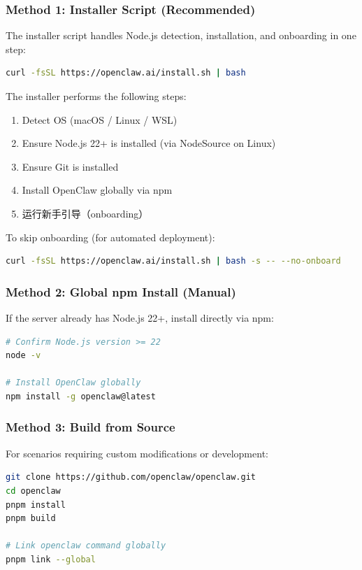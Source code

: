 \subsubsection{Method 1: Installer Script (Recommended)}

The installer script handles Node.js detection, installation, and onboarding in one step:

\begin{lstlisting}[language=bash]
curl -fsSL https://openclaw.ai/install.sh | bash
\end{lstlisting}

The installer performs the following steps:
\begin{enumerate}
  \item Detect OS (macOS / Linux / WSL)
  \item Ensure Node.js 22+ is installed (via NodeSource on Linux)
  \item Ensure Git is installed
  \item Install OpenClaw globally via npm
  \item 运行新手引导（onboarding）
\end{enumerate}

To skip onboarding (for automated deployment):

\begin{lstlisting}[language=bash]
curl -fsSL https://openclaw.ai/install.sh | bash -s -- --no-onboard
\end{lstlisting}

\subsubsection{Method 2: Global npm Install (Manual)}

If the server already has Node.js 22+, install directly via npm:

\begin{lstlisting}[language=bash]
# Confirm Node.js version >= 22
node -v

# Install OpenClaw globally
npm install -g openclaw@latest
\end{lstlisting}

\subsubsection{Method 3: Build from Source}

For scenarios requiring custom modifications or development:

\begin{lstlisting}[language=bash]
git clone https://github.com/openclaw/openclaw.git
cd openclaw
pnpm install
pnpm build

# Link openclaw command globally
pnpm link --global
\end{lstlisting}

